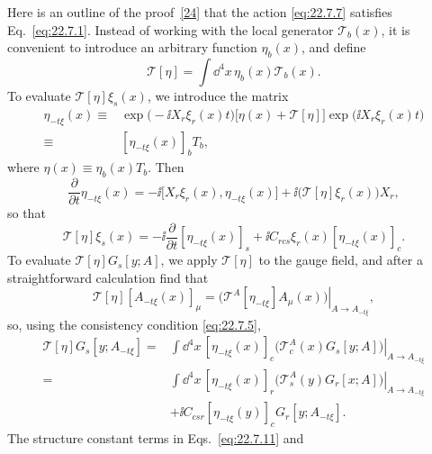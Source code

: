 Here is an outline of the proof~\hyperref[ch22-ref-24]{[24]} that the
action \eqref{eq:22.7.7} satisfies Eq.~\eqref{eq:22.7.1}. Instead of
working with the local generator $\mathcal T_b(x)$, it is convenient
to introduce an arbitrary function $\eta_b(x)$, and define
\begin{equation}
 \mathcal T[\eta]
 =\int \dd^4x\,\eta_b(x)\mathcal T_b(x).
 \tag{22.7.9}\label{eq:22.7.9}
\end{equation}
To evaluate $\mathcal T[\eta]\xi_s(x)$, we introduce the matrix
\begin{equation}
 \begin{aligned}
 \eta_{-t\xi}(x)
 \equiv{}&\exp\bigl(-\ii X_r\xi_r(x)t\bigr)
 \bigl[\eta(x)+\mathcal T[\eta]\bigr]
 \exp\bigl(\ii X_r\xi_r(x)t\bigr)
 \\
 \equiv{}&[\eta_{-t\xi}(x)]_b T_b,
 \end{aligned}
 \tag{22.7.10}\label{eq:22.7.10}
\end{equation}
where $\eta(x)\equiv\eta_b(x)T_b$. Then
\[
 \frac{\partial}{\partial t}\eta_{-t\xi}(x)
 =-\ii\bigl[X_r\xi_r(x),\eta_{-t\xi}(x)\bigr]
 +\ii\bigl(\mathcal T[\eta]\xi_r(x)\bigr)X_r,
\]
so that
\begin{equation}
 \mathcal T[\eta]\xi_s(x)
 =-\ii\frac{\partial}{\partial t}[\eta_{-t\xi}(x)]_s
 +\ii C_{rc s}\xi_r(x)[\eta_{-t\xi}(x)]_c.
 \tag{22.7.11}\label{eq:22.7.11}
\end{equation}
To evaluate $\mathcal T[\eta]G_s[y;A]$, we apply $\mathcal T[\eta]$ to
the gauge field, and after a straightforward calculation find that
\begin{equation}
 \mathcal T[\eta][A_{-t\xi}(x)]_\mu
 =\left.
 \bigl(\mathcal T^A[\eta_{-t\xi}]A_\mu(x)\bigr)
 \right|_{A\to A_{-t\xi}},
 \tag{22.7.12}\label{eq:22.7.12}
\end{equation}
so, using the consistency condition \eqref{eq:22.7.5},
\begin{equation}
 \begin{aligned}
 \mathcal T[\eta]G_s[y;A_{-t\xi}]
 ={}&\int \dd^4x\,[\eta_{-t\xi}(x)]_c
 \left.
 \bigl(\mathcal T_c^A(x)G_s[y;A]\bigr)
 \right|_{A\to A_{-t\xi}}
 \\
 ={}&\int \dd^4x\,[\eta_{-t\xi}(x)]_r
 \left.
 \bigl(\mathcal T_s^A(y)G_r[x;A]\bigr)
 \right|_{A\to A_{-t\xi}}
 \\
 &+\ii C_{c sr}[\eta_{-t\xi}(y)]_c
 G_r[y;A_{-t\xi}].
 \end{aligned}
 \tag{22.7.13}\label{eq:22.7.13}
\end{equation}
The structure constant terms in Eqs.~\eqref{eq:22.7.11} and
